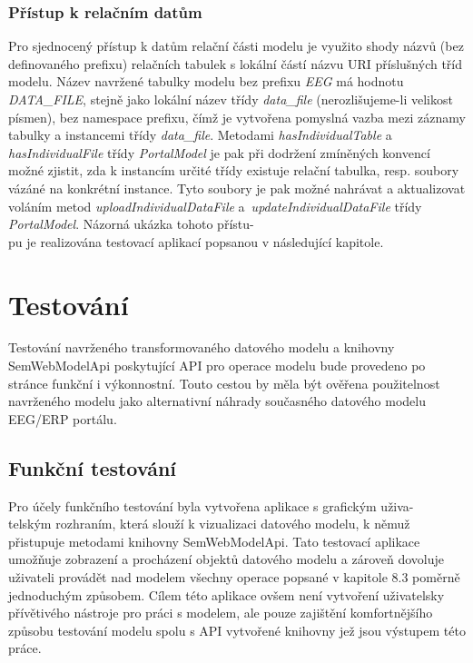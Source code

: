 \documentclass{projekt}
\begin{document}
\subsection{Přístup k relačním datům}
\hspace{0.65cm}Pro sjednocený přístup k datům relační části modelu je využito shody názvů (bez definovaného prefixu) relačních tabulek s lokální částí názvu URI příslušných tříd modelu. Název navržené tabulky modelu bez prefixu {\it EEG} má hodnotu {\it DATA\_FILE}, stejně jako lokální název třídy {\it data\_file} (nerozlišujeme-li velikost písmen), bez namespace prefixu, čímž je vytvořena pomyslná vazba mezi záznamy tabulky a instancemi třídy {\it data\_file}. Metodami {\it hasIndividualTable} a {\it hasIndividualFile} třídy {\it PortalModel} je pak při dodržení zmíněných konvencí možné zjistit, zda k instancím určité třídy existuje relační tabulka, resp. soubory vázáné na konkrétní instance. Tyto soubory je pak možné nahrávat a aktualizovat voláním metod {\it uploadIndividualDataFile} a~{\it updateIndividualDataFile} třídy {\it PortalModel}. Názorná ukázka tohoto přístu-\\pu je realizována testovací aplikací popsanou v následující kapitole.


\chapter{Testování}
\hspace{0.65cm}Testování navrženého transformovaného datového modelu a knihovny SemWebModelApi poskytující API pro operace modelu bude provedeno po stránce funkční i výkonnostní. Touto cestou by měla být ověřena použitelnost navrženého modelu jako alternativní náhrady současného datového modelu EEG/ERP portálu.

\section{Funkční testování}
\hspace{0.65cm}Pro účely funkčního testování byla vytvořena aplikace s grafickým uživa-\\telským rozhraním, která slouží k vizualizaci datového modelu, k němuž přistupuje metodami knihovny SemWebModelApi. Tato testovací aplikace umožňuje zobrazení a procházení objektů datového modelu a zároveň dovoluje uživateli provádět nad modelem všechny operace popsané v kapitole 8.3 poměrně jednoduchým způsobem. Cílem této aplikace ovšem není vytvoření uživatelsky přívětivého nástroje pro práci s modelem, ale pouze zajištění komfortnějšího způsobu testování modelu spolu s API vytvořené knihovny jež jsou výstupem této práce.
\end{document}
